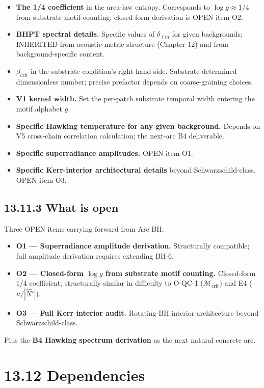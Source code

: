 \documentclass[11pt]{book}
\begin{document}
\begin{itemize}
\item \textbf{The 1/4 coefficient} in the area-law entropy. Corresponds to $\log g \approx 1/4$ from substrate motif counting; closed-form derivation is OPEN item O2.
\item \textbf{BHPT spectral details.} Specific values of $\delta_{\ell m}$ for given backgrounds; INHERITED from acoustic-metric structure (Chapter 12) and from background-specific content.
\item \textbf{$\beta_\mathrm{crit}$} in the substrate condition's right-hand side. Substrate-determined dimensionless number; precise prefactor depends on coarse-graining choices.
\item \textbf{V1 kernel width.} Set the per-patch substrate temporal width entering the motif alphabet $g$.
\item \textbf{Specific Hawking temperature for any given background.} Depends on V5 cross-chain correlation calculation; the next-arc B4 deliverable.
\item \textbf{Specific superradiance amplitudes.} OPEN item O1.
\item \textbf{Specific Kerr-interior architectural details} beyond Schwarzschild-class. OPEN item O3.
\end{itemize}

\subsection{13.11.3 What is open}

Three OPEN items carrying forward from Arc BH:

\begin{itemize}
\item \textbf{O1 — Superradiance amplitude derivation.} Structurally compatible; full amplitude derivation requires extending BH-6.
\item \textbf{O2 — Closed-form $\log g$ from substrate motif counting.} Closed-form $1/4$ coefficient; structurally similar in difficulty to O-QC-1 ($\mathcal{M}_\mathrm{crit}$) and E4 ($\kappa/|\hat{N}'|$).
\item \textbf{O3 — Full Kerr interior audit.} Rotating-BH interior architecture beyond Schwarzschild-class.
\end{itemize}

Plus the \textbf{B4 Hawking spectrum derivation} as the next natural concrete arc.

\section{13.12 Dependencies}
\end{document}
